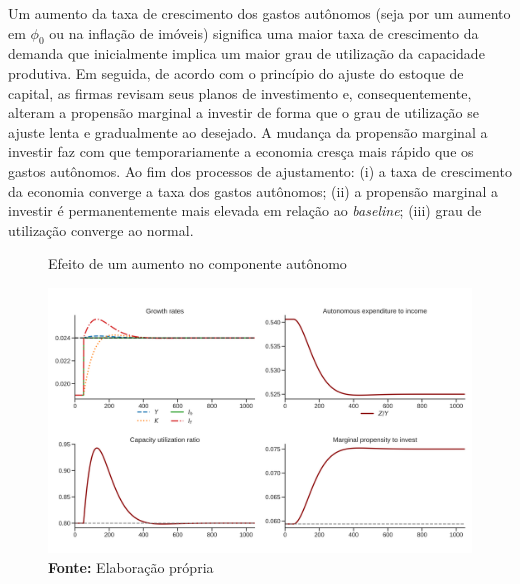 
Um aumento da taxa de crescimento dos gastos autônomos (seja por um aumento em $\phi_0$ ou na inflação de imóveis) significa uma maior taxa de crescimento da demanda que inicialmente implica um maior grau de utilização da capacidade produtiva. Em seguida, de acordo com o princípio do ajuste do estoque de capital, as firmas revisam seus planos de investimento e, consequentemente, alteram a propensão marginal a investir de forma que o grau de utilização se ajuste lenta e gradualmente ao desejado. A mudança da propensão marginal a investir faz com que temporariamente a economia cresça mais rápido que os gastos autônomos. Ao fim dos processos de ajustamento: (i) a taxa de crescimento da economia converge a taxa dos gastos autônomos; (ii) a propensão marginal a investir é permanentemente mais elevada em relação ao \textit{baseline}; (iii) grau de utilização converge ao normal.



\begin{figure}[H]
	\centering
	\caption{Efeito de um aumento no componente autônomo}
	\label{choque_1}
	\includegraphics[width=\textwidth]{../../Modelo/Versoes/Shock_1.png}
	\caption*{\textbf{Fonte:} Elaboração própria}
\end{figure}


